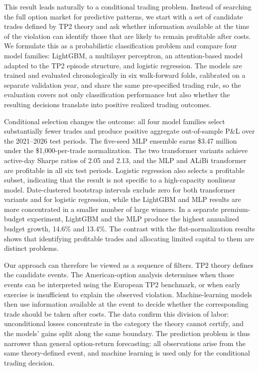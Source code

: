 \documentclass[sigconf,review,anonymous]{acmart}
\begin{document}
This result leads naturally to a conditional trading problem. Instead of searching the full option market for predictive patterns, we start with a set of candidate trades defined by TP2 theory and ask whether information available at the time of the violation can identify those that are likely to remain profitable after costs. We formulate this as a probabilistic classification problem and compare four model families: LightGBM, a multilayer perceptron, an attention-based model adapted to the TP2 episode structure, and logistic regression. The models are trained and evaluated chronologically in six walk-forward folds, calibrated on a separate validation year, and share the same pre-specified trading rule, so the evaluation covers not only classification performance but also whether the resulting decisions translate into positive realized trading outcomes.

Conditional selection changes the outcome: all four model families select substantially fewer trades and produce positive aggregate out-of-sample P\&L over the 2021--2026 test periods. The five-seed MLP ensemble earns \$3.47 million under the \$1{,}000-per-trade normalization. The two transformer variants achieve active-day Sharpe ratios of 2.05 and 2.13, and the MLP and ALiBi transformer are profitable in all six test periods. Logistic regression also selects a profitable subset, indicating that the result is not specific to a high-capacity nonlinear model. Date-clustered bootstrap intervals exclude zero for both transformer variants and for logistic regression, while the LightGBM and MLP results are more concentrated in a smaller number of large winners. In a separate premium-budget experiment, LightGBM and the MLP produce the highest annualized budget growth, 14.6\% and 13.4\%. The contrast with the flat-normalization results shows that identifying profitable trades and allocating limited capital to them are distinct problems.

Our approach can therefore be viewed as a sequence of filters. TP2 theory defines the candidate events. The American-option analysis determines when those events can be interpreted using the European TP2 benchmark, or when early exercise is insufficient to explain the observed violation. Machine-learning models then use information available at the event to decide whether the corresponding trade should be taken after costs. The data confirm this division of labor: unconditional losses concentrate in the category the theory cannot certify, and the models' gains split along the same boundary. The prediction problem is thus narrower than general option-return forecasting: all observations arise from the same theory-defined event, and machine learning is used only for the conditional trading decision.
\end{document}

